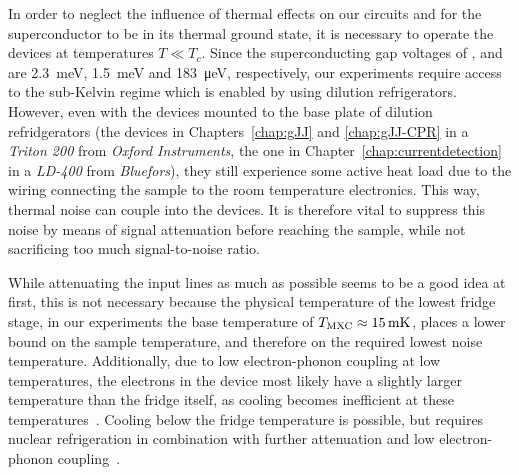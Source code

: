 In order to neglect the influence of thermal effects on our circuits and for the superconductor to be in its thermal ground state, it is necessary to operate the devices at temperatures $T \ll T_c$.
%
Since the superconducting gap voltages of ,  and  are \SI{2.3}{\milli\electronvolt}, \SI{1.5}{\milli\electronvolt} and \SI{183}{\micro\electronvolt}, respectively, our experiments require access to the sub-Kelvin regime which is enabled by using dilution refrigerators.
%
However, even with the devices mounted to the base plate of dilution refridgerators (the devices in Chapters~\ref{chap:gJJ} and \ref{chap:gJJ-CPR} in a \textit{Triton 200} from \textit{Oxford Instruments}, the one in Chapter~\ref{chap:currentdetection} in a \textit{LD-400} from \textit{Bluefors}), they still experience some active heat load due to the wiring connecting the sample to the room temperature electronics.
%
This way, thermal noise can couple into the devices.
%
It is therefore vital to suppress this noise by means of signal attenuation before reaching the sample, while not sacrificing too much signal-to-noise ratio.



While attenuating the input lines as much as possible seems to be a good idea at first, this is not necessary because the physical temperature of the lowest fridge stage, in our experiments the base temperature of $T_{\rm MXC}\approx\SI{15}{\milli\kelvin}$, places a lower bound on the sample temperature, and therefore on the required lowest noise temperature.
%
Additionally, due to low electron-phonon coupling at low temperatures, the electrons in the device most likely have a slightly larger temperature than the fridge itself, as cooling becomes inefficient at these temperatures~\cite{giazottoOpportunitiesMesoscopicsThermometry2006}.
%
Cooling below the fridge temperature is possible, but requires nuclear refrigeration in combination with further attenuation and low electron-phonon coupling~\cite{sarsby500MicrokelvinNanoelectronics2020}.
%

